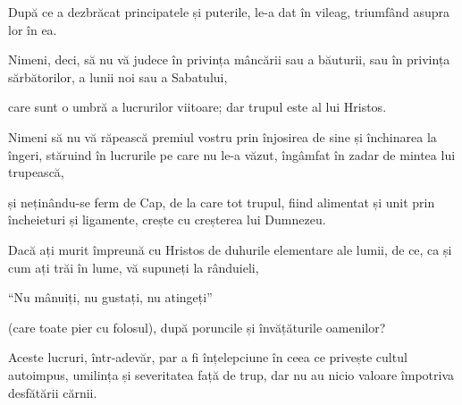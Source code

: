 {După ce a dezbrăcat principatele și puterile, le-a dat în vileag, triumfând asupra lor în ea.


\par }{\PP {}Nimeni, deci, să nu vă judece în privința mâncării sau a băuturii, sau în privința sărbătorilor, a lunii noi sau a Sabatului,

care sunt o umbră a lucrurilor viitoare; dar trupul este al lui Hristos.

Nimeni să nu vă răpească premiul vostru prin înjosirea de sine și închinarea la îngeri, stăruind în lucrurile pe care nu le-a văzut, îngâmfat în zadar de mintea lui trupească,

și neținându-se ferm de Cap, de la care tot trupul, fiind alimentat și unit prin încheieturi și ligamente, crește cu creșterea lui Dumnezeu.


\par }{\PP {}Dacă ați murit împreună cu Hristos de duhurile elementare ale lumii, de ce, ca și cum ați trăi în lume, vă supuneți la rânduieli,

“Nu mânuiți, nu gustați, nu atingeți”

(care toate pier cu folosul), după poruncile și învățăturile oamenilor?

Aceste lucruri, într-adevăr, par a fi înțelepciune în ceea ce privește cultul autoimpus, umilința și severitatea față de trup, dar nu au nicio valoare împotriva desfătării cărnii.



\par }
